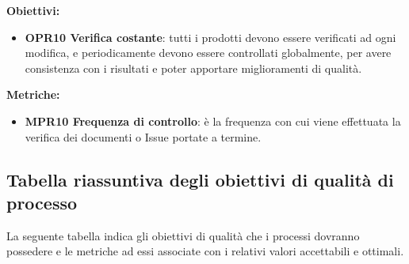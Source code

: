 \documentclass[../piano_di_qualifica.tex]{subfiles}
\begin{document}
\textbf{Obiettivi:}
\smallbreak
\begin{itemize}
	\item \textbf{OPR10 Verifica costante}: tutti i prodotti devono essere verificati ad ogni modifica, e periodicamente devono essere controllati globalmente, per avere consistenza con i risultati e poter apportare miglioramenti di qualità.
\end{itemize}

\textbf{Metriche:}
\smallbreak
\begin{itemize}
	\item \textbf{MPR10 Frequenza di controllo}: è la frequenza con cui viene effettuata la verifica dei documenti o Issue portate a termine.
\end{itemize}

\subsection{Tabella riassuntiva degli obiettivi di qualità di processo}
La seguente tabella indica gli obiettivi di qualità che i processi dovranno possedere e le metriche ad essi associate con i relativi valori accettabili e ottimali.
\end{document}
